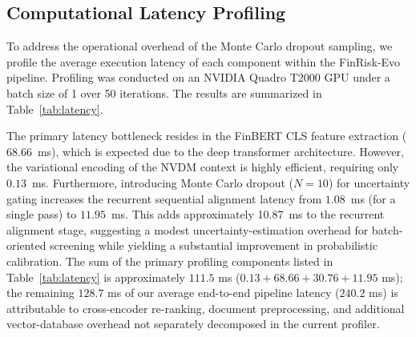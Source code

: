 \documentclass[journal]{IEEEtran}
\begin{document}
\begin{table}[h]
\centering
\caption{Downstream Classification Performance Under Alternative Longitudinal Alignment Strategies}
\label{tab:retrieval_ablation}
\end{table}

\subsection{Computational Latency Profiling}
To address the operational overhead of the Monte Carlo dropout sampling, we profile the average execution latency of each component within the FinRisk-Evo pipeline. Profiling was conducted on an NVIDIA Quadro T2000 GPU under a batch size of 1 over 50 iterations. The results are summarized in Table~\ref{tab:latency}.

The primary latency bottleneck resides in the FinBERT CLS feature extraction ($68.66$~ms), which is expected due to the deep transformer architecture. However, the variational encoding of the NVDM context is highly efficient, requiring only $0.13$~ms. Furthermore, introducing Monte Carlo dropout ($N=10$) for uncertainty gating increases the recurrent sequential alignment latency from $1.08$~ms (for a single pass) to $11.95$~ms. This adds approximately 10.87~ms to the recurrent alignment stage, suggesting a modest uncertainty-estimation overhead for batch-oriented screening while yielding a substantial improvement in probabilistic calibration. The sum of the primary profiling components listed in Table~\ref{tab:latency} is approximately $111.5$ ms ($0.13 + 68.66 + 30.76 + 11.95$ ms); the remaining $128.7$ ms of our average end-to-end pipeline latency ($240.2$ ms) is attributable to cross-encoder re-ranking, document preprocessing, and additional vector-database overhead not separately decomposed in the current profiler.
\end{document}
